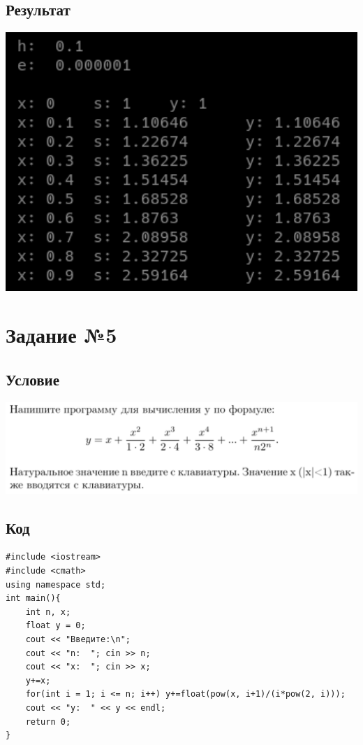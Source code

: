 \documentclass[a4paper]{article}
\begin{document}
\subsection{Результат}
\includegraphics[width=1\textwidth]{4.png}
\newpage
\section{Задание №5} 
\subsection{Условие}
\includegraphics[width=1\textwidth]{task5.png}
\subsection{Код}
\small
\begin{verbatim}
#include <iostream>
#include <cmath>
using namespace std;
int main(){
    int n, x;
    float y = 0;
    cout << "Введите:\n";
    cout << "n:  "; cin >> n;
    cout << "x:  "; cin >> x;
    y+=x;
    for(int i = 1; i <= n; i++) y+=float(pow(x, i+1)/(i*pow(2, i)));
    cout << "y:  " << y << endl;
    return 0;
}
\end{verbatim}\normalsize
\end{document}
